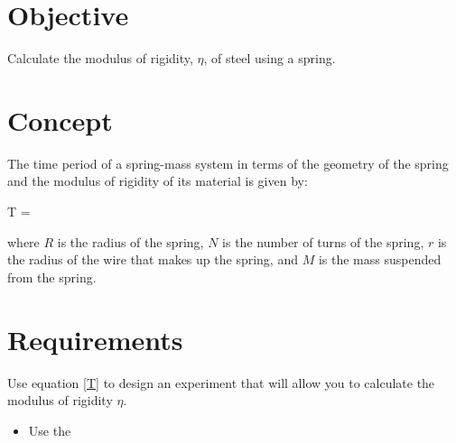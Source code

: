 \setcounter{equation}{0}

\section*{Objective}

    Calculate the modulus of rigidity, $\eta$, of steel using a spring.


\section*{Concept}

    The time period of a spring-mass system in terms of the geometry of the spring and the modulus of rigidity of its material is given by:

    \beq \label{T}
        T =  
    \eeq

    where $R$ is the radius of the spring, $N$ is the number of turns of the spring, $r$ is the radius of the wire that makes up the spring, and $M$ is the mass suspended from the spring.


\section*{Requirements}

    Use equation \eqref{T} to design an experiment that will allow you to calculate the modulus of rigidity $\eta$.

    \begin{itemize}
        \item Use the
    \end{itemize}
